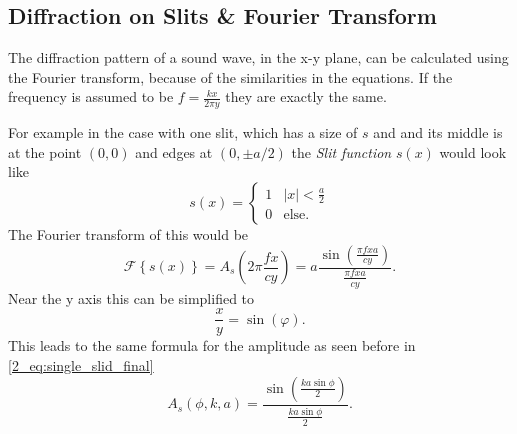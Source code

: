 \subsection{Diffraction on Slits \& Fourier Transform}\label{2_Acoustics_sec:diffraction_fourier}
The diffraction pattern of a sound wave, in the x-y plane, can be calculated using the Fourier transform, because of the similarities in the equations. If the frequency is assumed to be $f = \frac{k x}{2 \pi y}$ they are exactly the same. \cite{diffraction_fourier} 

For example in the case with one slit, which has a size of $s$ and and its middle is at the point $(0,0)$ and edges at $(0,\pm a/2)$ the \textit{Slit function} $s(x)$ would look like
\begin{equation}
     s(x) =
    \begin{cases}
      1 & \text{$|x| < \frac{a}{2}$}\\
      0 & \text{else}.
     \end{cases}
\end{equation}
The Fourier transform of this would be
\begin{equation}
    \mathcal{F}\left \{ s(x) \right \} = A_s\left ( 2\pi\frac{f x}{c y} \right ) = a\frac{\sin{\left(  \frac{\pi f x a}{c y} \right )}}{\frac{\pi f x a}{c y}}. 
\end{equation}
Near the y axis this can be simplified to \cite{alma99116706330905515}
\begin{equation}
    \frac{x}{y} = \sin{(\varphi)}.
\end{equation}
This leads to the same formula for the amplitude as seen before in \ref{2_eq:single_slid_final}
\begin{equation}
    A_s(\phi, k, a) = \frac{\sin \left ( \frac{ka \sin \phi}{2}\right )}{ \frac{ka \sin \phi}{2}}.
\end{equation}
